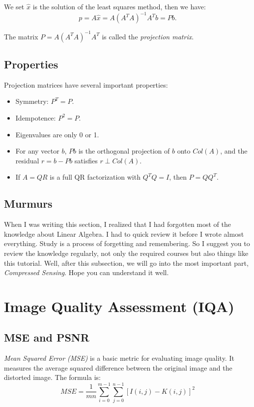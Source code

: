 \documentclass[10pt,a4paper,oneside,numbers=noenddot]{scrbook}
\theoremstyle{ctplain}
\theoremstyle{ctresult}
\begin{document}
We set $\hat{x}$ is the solution of the least squares method, then we have:
\[
  p = A\hat{x} = A(A^TA)^{-1}A^Tb = Pb.
\]

The matrix $P = A(A^TA)^{-1}A^T$ is called the \emph{projection matrix}.

\subsection{Properties}

Projection matrices have several important properties:

\begin{itemize}
  \item Symmetry: $P^T = P$.
  \item Idempotence: $P^2 = P$.
  \item Eigenvalues are only 0 or 1.
  \item For any vector $b$, $Pb$ is the orthogonal projection of $b$ onto $Col(A)$, and the residual $r = b - Pb$ satisfies $r \perp Col(A)$.
  \item If $A = Q R$ is a full QR factorization with $Q^T Q = I$, then $P = Q Q^T$.
\end{itemize}

\subsection{Murmurs}

When I was writing this section, I realized that I had forgotten most of the knowledge about
Linear Algebra. I had to quick review it before I wrote almost everything. Study is a
process of forgetting and remembering. So I suggest you to review the knowledge
regularly, not only the required courses but also things like this tutorial. Well, after this
subsection, we will go into the most important part, \emph{Compressed Sensing}. Hope you
can understand it well.

\section{Image Quality Assessment (IQA)}
\subsection{MSE and PSNR}

\emph{Mean Squared Error (MSE)} is a basic metric for evaluating image quality. It
measures the average squared difference between the original image and the distorted
image. The formula is:
\[
  MSE = \frac{1}{mn} \sum_{i=0}^{m-1} \sum_{j=0}^{n-1} [I(i,j) - K(i,j)]^2
\]
\end{document}
